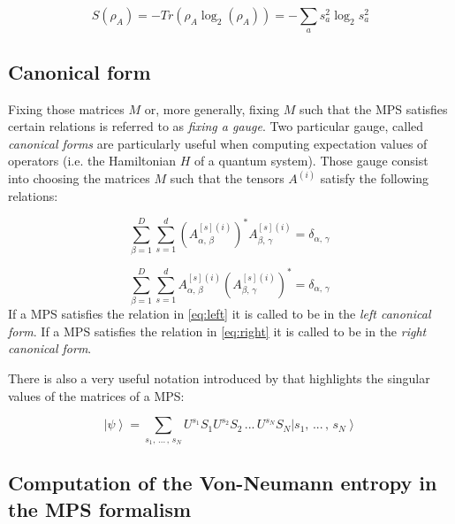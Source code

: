 \documentclass[12pt, a4paper, twoside, titlepage]{article}
\newcommand{\ket}[1]{\ensuremath{\left|#1\right\rangle}}
\begin{document}
\begin{equation}\label{eq:derived_entropy}
S(\rho_A)=-Tr(\rho_A\log_2(\rho_A))= -\sum_a s^2_a\log_2 s^2_a
\end{equation}

\subsection{Canonical form}

Fixing those matrices $M$ or, more generally, fixing $M$ such that the MPS satisfies certain relations is referred to as \textit{fixing a gauge}.
Two particular gauge, called \textit{canonical forms} are particularly useful when computing expectation values of operators (i.e. the Hamiltonian $H$ of a quantum system). Those gauge consist into choosing the matrices $M$ such that the tensors $A^{(i)}$ satisfy the following relations:

\begin{equation}\label{eq:left}
\sum_{\beta=1}^D\sum_{s=1}^d \left(A^{[s](i)}_{\alpha, \, \beta}\right)^* A^{[s](i)}_{\beta, \, \gamma}= \delta_{\alpha, \, \gamma}  \, \end{equation}

\begin{equation}\label{eq:right}
\sum_{\beta=1}^D\sum_{s=1}^d A^{[s](i)}_{\alpha, \, \beta} \left(A^{[s](i)}_{\beta, \, \gamma}\right)^* = \delta_{\alpha, \, \gamma} \,
\end{equation}
If a MPS satisfies the relation in \cref{eq:left} it is called to be in the \textit{left canonical form}. If a MPS satisfies the relation in \cref{eq:right} it is called to be in the \textit{right canonical form}.

There is also a very useful notation introduced by \cite{Vidal_2003} that highlights the singular values of the matrices of a MPS:

\begin{equation} \label{eq:vidal_form}
\ket \psi = \sum_{s_1, \, ... \, , \, s_N} U^{s_1} S_{1}U^{s_2} S_{2} \, ... \, U^{s_N} S_{N} \ket{s_1, \, ... \, , \, s_N}
\end{equation}



\subsection{Computation of the Von-Neumann entropy in the MPS formalism}
\end{document}
